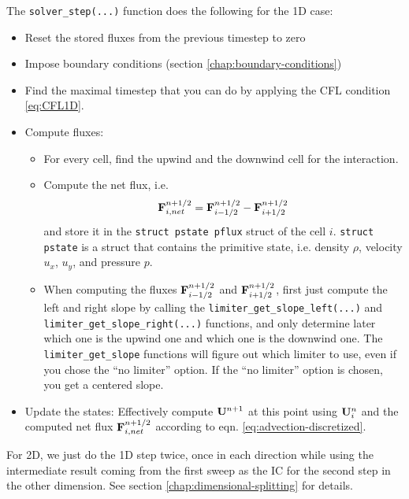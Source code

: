 The \verb|solver_step(...)| function does the following for the 1D case:
\begin{itemize}
	\item 	Reset the stored fluxes from the previous timestep to zero
	\item 	Impose boundary conditions (section \ref{chap:boundary-conditions})
	\item 	Find the maximal timestep that you can do by applying the CFL condition \ref{eq:CFL1D}.
	\item 	Compute fluxes:
	\begin{itemize}
		\item 	For every cell, find the upwind and the downwind cell for the interaction.
		\item 	Compute the net flux, i.e.
				\begin{equation}
				\mathbf{F}_{i, net}^{n+1/2} = \mathbf{F}_{i-1/2}^{n+1/2} - \mathbf{F}_{i+1/2}^{n+1/2}
				\end{equation}
				and store it in the \texttt{struct pstate pflux} struct of the cell $i$.
				\texttt{struct pstate} is a struct that contains the primitive state, i.e. density $\rho$, velocity $u_x$, $u_y$, and pressure $p$.
		\item 	When computing the fluxes $\mathbf{F}_{i-1/2}^{n+1/2}$ and $\mathbf{F}_{i+1/2}^{n+1/2}$, first just compute the left and right slope by calling the \verb|limiter_get_slope_left(...)| and \verb|limiter_get_slope_right(...)| functions, and only determine later which one is the upwind one and which one is the downwind one.
				The \verb|limiter_get_slope| functions will figure out which limiter to use, even if you chose the ``no limiter'' option.
				If the ``no limiter'' option is chosen, you get a centered slope.
	\end{itemize}
	\item 	Update the states: Effectively compute $\mathbf{U}^{n+1}$ at this point using $\mathbf{U}_i^n$ and the computed net flux $\mathbf{F}_{i, net}^{n+1/2}$ according to eqn. \ref{eq:advection-discretized}.
\end{itemize}



For 2D, we just do the 1D step twice, once in each direction while using the intermediate result coming from the first sweep as the IC for the second step in the other dimension.
See section \ref{chap:dimensional-splitting} for details.










